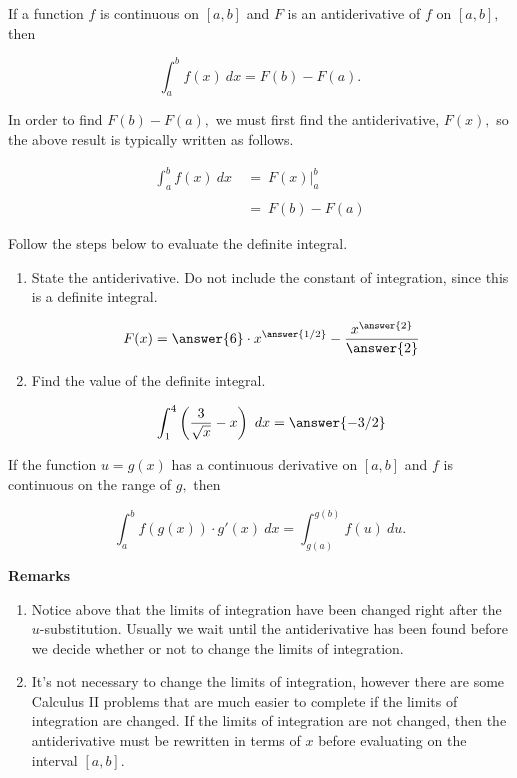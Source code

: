 \documentclass{ximera}
\begin{document}
\begin{theorem}

If a function $f$ is continuous on $[a,b]$ and $F$ is an antiderivative of $f$ on
$[a,b],$ then

\[ \int_{a}^{b} f(x) \ dx =  F(b)-F(a). \]

\end{theorem}

\begin{remark}
In order to find $F(b)-F(a),$ we must first find the antiderivative, $F(x),$ so the above result is typically written
as follows.

\begin{align*}
\int_{a}^{b} f(x) \ dx & \ = \ F(x) \bigg |_{a}^{b} \\
& \\
& \ = \ F(b)-F(a)
\end{align*}
\end{remark}

\begin{problem}
Follow the steps below to evaluate the definite integral.  

\begin{enumerate}
\item State the antiderivative.  Do not include the constant of integration, since this is a definite integral. 

    \[ F(x) = \answer{6} \cdot x^{\answer{1/2}} - \frac{x^{\answer{2}}}{\answer{2}} \]


\item Find the value of the definite integral.

    \[ \int_{1}^{4} \left( \frac{3}{\sqrt{x}} - x \right) \ dx = \answer{-3/2}  \] 

\end{enumerate}
\end{problem}


\begin{theorem}

If the function $u=g(x)$ has a continuous derivative on $[a,b]$ and $f$ is continuous on the range of $g,$
then

\[ \int_a^b f(g(x)) \cdot g'(x) \ dx = \int_{g(a)}^{g(b)} f(u) \ du. \]


\textbf{Remarks}

\begin{enumerate}
\item Notice above that the limits of integration have been
changed right after the $u$-substitution.  Usually we wait until the
antiderivative has been found before we decide whether or not to
change the limits of integration.

\item It's not necessary to change the limits of
integration, however there are some Calculus II problems that are much easier to complete if the
limits of integration are changed.  If the limits of
integration are not changed, then the antiderivative must be
rewritten in terms of $x$ before evaluating on the interval
$[a,b].$
\end{enumerate}
\end{theorem}
\end{document}
